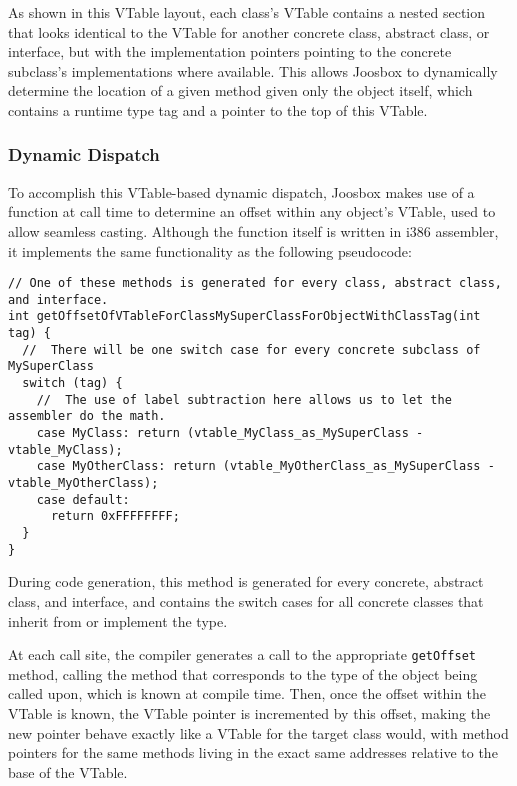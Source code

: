 \documentclass[letterpaper]{article}
\begin{document}
  As shown in this VTable layout, each class's VTable contains a nested section that looks identical
  to the VTable for another concrete class, abstract class, or interface, but with the implementation
  pointers pointing to the concrete subclass's implementations where available. This allows Joosbox to
  dynamically determine the location of a given method given only the object itself, which contains
  a runtime type tag and a pointer to the top of this VTable.

  \subsubsection{Dynamic Dispatch}

  To accomplish this VTable-based dynamic dispatch, Joosbox makes use of a function at call
  time to determine an offset within any object's VTable, used to allow seamless casting. Although
  the function itself is written in i386 assembler, it implements the same functionality as the following
  pseudocode:

  \begin{verbatim}
// One of these methods is generated for every class, abstract class, and interface.
int getOffsetOfVTableForClassMySuperClassForObjectWithClassTag(int tag) {
  //  There will be one switch case for every concrete subclass of MySuperClass
  switch (tag) {
    //  The use of label subtraction here allows us to let the assembler do the math.
    case MyClass: return (vtable_MyClass_as_MySuperClass - vtable_MyClass);
    case MyOtherClass: return (vtable_MyOtherClass_as_MySuperClass - vtable_MyOtherClass);
    case default:
      return 0xFFFFFFFF;
  }
}
  \end{verbatim}


  During code generation, this method is generated for every concrete, abstract class, and interface,
  and contains the switch cases for all concrete classes that inherit from or implement the type.

  At each call site, the compiler generates a call to the appropriate {\tt getOffset} method,
  calling the method that corresponds to the type of the object being called upon, which is known at compile
  time. Then, once the offset within the VTable is known, the VTable pointer is incremented by this offset,
  making the new pointer behave exactly like a VTable for the target class would, with method pointers for
  the same methods living in the exact same addresses relative to the base of the VTable.
\end{document}
